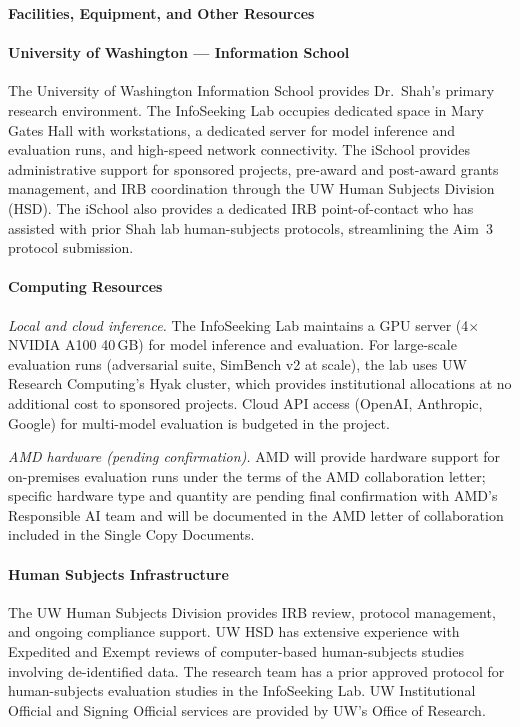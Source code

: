 \begin{center}
{\Large \textbf{Facilities, Equipment, and Other Resources}}
\end{center}
\vspace*{-8pt}

\paragraph{University of Washington --- Information School}

The University of Washington Information School provides Dr.\ Shah's primary research environment. The InfoSeeking Lab occupies dedicated space in Mary Gates Hall with workstations, a dedicated server for model inference and evaluation runs, and high-speed network connectivity. The iSchool provides administrative support for sponsored projects, pre-award and post-award grants management, and IRB coordination through the UW Human Subjects Division (HSD). The iSchool also provides a dedicated IRB point-of-contact who has assisted with prior Shah lab human-subjects protocols, streamlining the Aim~3 protocol submission.

\paragraph{Computing Resources}

\textit{Local and cloud inference.} The InfoSeeking Lab maintains a GPU server (4$\times$ NVIDIA A100 40\,GB) for model inference and evaluation. For large-scale evaluation runs (adversarial suite, SimBench v2 at scale), the lab uses UW Research Computing's Hyak cluster, which provides institutional allocations at no additional cost to sponsored projects. Cloud API access (OpenAI, Anthropic, Google) for multi-model evaluation is budgeted in the project.

\textit{AMD hardware (pending confirmation).} AMD will provide hardware support for on-premises evaluation runs under the terms of the AMD collaboration letter; specific hardware type and quantity are pending final confirmation with AMD's Responsible AI team and will be documented in the AMD letter of collaboration included in the Single Copy Documents.

\paragraph{Human Subjects Infrastructure}

The UW Human Subjects Division provides IRB review, protocol management, and ongoing compliance support. UW HSD has extensive experience with Expedited and Exempt reviews of computer-based human-subjects studies involving de-identified data. The research team has a prior approved protocol for human-subjects evaluation studies in the InfoSeeking Lab. UW Institutional Official and Signing Official services are provided by UW's Office of Research.

